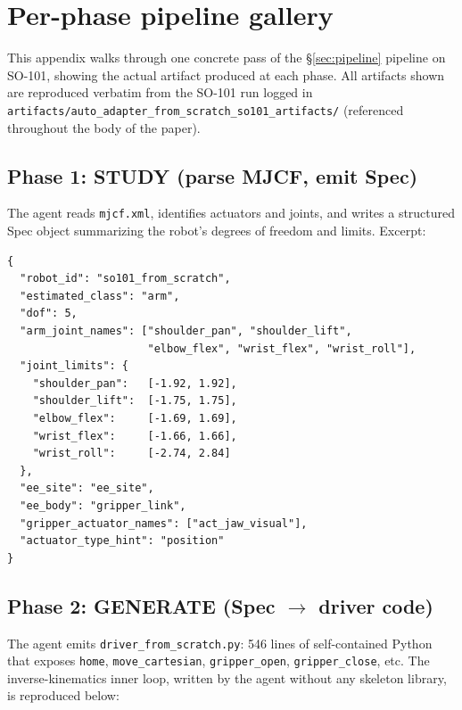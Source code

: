 \section{Per-phase pipeline gallery}
\label{app:gallery}

This appendix walks through one concrete pass of the
\S\ref{sec:pipeline} pipeline on SO-101, showing the actual
artifact produced at each phase. All artifacts shown are reproduced
verbatim from the SO-101 run logged in
\texttt{artifacts/auto\_adapter\_from\_}\allowbreak\texttt{scratch\_so101\_artifacts/}
(referenced throughout the body of the paper).

\subsection{Phase 1: STUDY (parse MJCF, emit Spec)}

The agent reads \texttt{mjcf.xml}, identifies actuators and joints,
and writes a structured Spec object summarizing the robot's degrees
of freedom and limits. Excerpt:

\begin{lstlisting}[basicstyle=\ttfamily\scriptsize, frame=single, framerule=0pt,
    backgroundcolor=\color{gray!10}, columns=fullflexible, breaklines=true]
{
  "robot_id": "so101_from_scratch",
  "estimated_class": "arm",
  "dof": 5,
  "arm_joint_names": ["shoulder_pan", "shoulder_lift",
                      "elbow_flex", "wrist_flex", "wrist_roll"],
  "joint_limits": {
    "shoulder_pan":   [-1.92, 1.92],
    "shoulder_lift":  [-1.75, 1.75],
    "elbow_flex":     [-1.69, 1.69],
    "wrist_flex":     [-1.66, 1.66],
    "wrist_roll":     [-2.74, 2.84]
  },
  "ee_site": "ee_site",
  "ee_body": "gripper_link",
  "gripper_actuator_names": ["act_jaw_visual"],
  "actuator_type_hint": "position"
}
\end{lstlisting}

\subsection{Phase 2: GENERATE (Spec $\rightarrow$ driver code)}

The agent emits \texttt{driver\_from\_scratch.py}: 546 lines of
self-contained Python that exposes \texttt{home}, \texttt{move\_cartesian},
\texttt{gripper\_open}, \texttt{gripper\_close}, etc. The
inverse-kinematics inner loop, written by the agent without any
skeleton library, is reproduced below:

